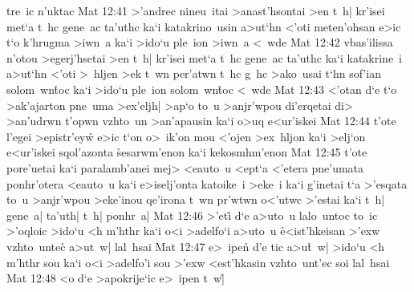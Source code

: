 tre~ic
n'uktac\bibvsend
\vs Mat 12:41
>'andrec
nineu~itai
>anast'hsontai
>en
t~h|
kr'isei
met`a
t~hc
gene~ac
ta'uthc
ka`i
katakrino~usin
a>ut`hn
<'oti
meten'ohsan
e>ic
t`o
k'hrugma
>iwn~a
ka`i
>ido`u
ple~ion
>iwn~a
<~wde\bibvsend
\vs Mat 12:42
vbas'ilissa
n'otou
>egerj'hsetai
>en
t~h|
kr'isei
met`a
t~hc
gene~ac
ta'uthc
ka`i
katakrine~i
a>ut`hn
<'oti
>~hljen
>ek
t~wn
per'atwn
t~hc
g~hc
>ako~usai
t`hn
sof'ian
solom~wn\r{t}oc
ka`i
>ido`u
ple~ion
solom~wn\r{t}oc
<~wde\bibvsend
\vs Mat 12:43
<'otan
d`e
t`o
>ak'ajarton
pne~uma
>ex'eljh|
>ap`o
to~u
>anjr'wpou
di'erqetai
di>
>an'udrwn
t'opwn
vzhto~un
>an'apausin
ka`i
o>uq
e<ur'iskei\bibvsend
\vs Mat 12:44
t'ote
l'egei
>epistr'eyw\r{}
e>ic
t`on
o>~ik'on
mou
<'ojen
>ex~hljon
ka`i
>elj`on
e<ur'iskei
sqol'azonta
\r{s}esarwm'enon
ka`i
kekosmhm'enon\bibvsend
\vs Mat 12:45
t'ote
pore'uetai
ka`i
paralamb'anei
mej>
<eauto~u
<ept`a
<'etera
pne'umata
ponhr'otera
<eauto~u
ka`i
e>iselj'onta
katoike~i
>eke~i
ka`i
g'inetai
t`a
>'esqata
to~u
>anjr'wpou
>eke'inou
qe'irona
t~wn
pr'wtwn
o<'utwc
>'estai
ka`i
t~h|
gene~a|
ta'uth|
t~h|
ponhr~a|\bibvsend
\vs Mat 12:46
>'eti\r{}
d`e
a>uto~u
lalo~untoc
to~ic
>'oqloic
>ido`u
<h
m'hthr
ka`i
o<i
>adelfo`i
a>uto~u
\r{e}<ist'hkeisan
>'exw
vzhto~untec\r{}
a>ut~w|
lal~hsai\bibvsend
\vs Mat 12:47
e>~ipen\r{}
d'e
tic
a>u\r{t}~w|
>ido`u
<h
m'hthr
sou
ka`i
o<i
>adelfo'i
sou
>'exw
<est'hkasin
vzhto~unt'ec
soi
lal~hsai\bibvsend
\vs Mat 12:48
<o
d`e
>apokrije`ic
e>~ipen
t~w|\r{}
